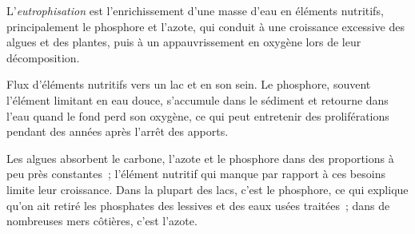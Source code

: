 \begin{definition}[Eutrophisation]\label{def:b3:environmental-toxicology:eutrophication}
L'\emph{eutrophisation} est l'enrichissement d'une
masse d'eau en éléments nutritifs, principalement le phosphore et l'azote,
qui conduit à une croissance excessive des algues et des plantes, puis à un
appauvrissement en oxygène lors de leur décomposition.
\end{definition}

\begin{omfigure}

{\small Flux d'éléments nutritifs vers un lac et en son sein. Le phosphore,
souvent l'élément limitant en eau douce, s'accumule dans le sédiment et
retourne dans l'eau quand le fond perd son oxygène, ce qui peut entretenir
des proliférations pendant des années après l'arrêt des apports.}
\end{omfigure}

Les algues absorbent le carbone, l'azote et le phosphore dans des
proportions à peu près constantes~; l'élément nutritif qui manque par
rapport à ces besoins limite leur croissance. Dans la plupart des lacs,
c'est le phosphore, ce qui explique qu'on ait retiré les phosphates des
lessives et des eaux usées traitées~; dans de nombreuses mers côtières,
c'est l'azote.

